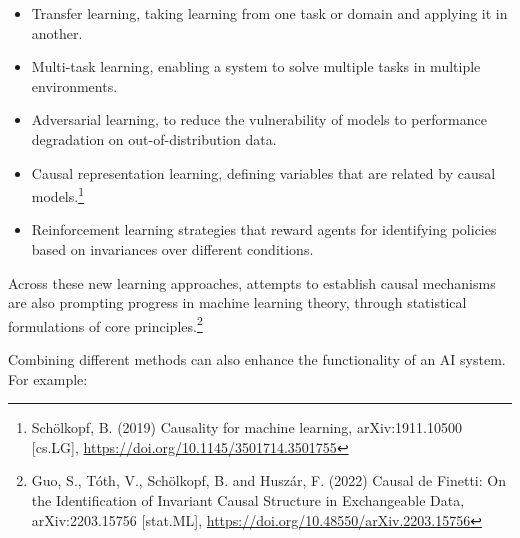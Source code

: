 \begin{itemize}
\item
  Transfer learning, taking learning from one task or domain and
  applying it in another.
\item
  Multi-task learning, enabling a system to solve multiple tasks in
  multiple environments.
\item
  Adversarial learning, to reduce the vulnerability of models to
  performance degradation on out-of-distribution data.
\item
  Causal representation learning, defining variables that are related by
  causal models.\footnote{Schölkopf, B. (2019) Causality for machine
    learning, arXiv:1911.10500 {[}cs.LG{]},
    \url{https://doi.org/10.1145/3501714.3501755}}
\item
  Reinforcement learning strategies that reward agents for identifying
  policies based on invariances over different conditions.
\end{itemize}

Across these new learning approaches, attempts to establish causal
mechanisms are also prompting progress in machine learning theory,
through statistical formulations of core principles.\footnote{Guo, S.,
  Tóth, V., Schölkopf, B. and Huszár, F. (2022) Causal de Finetti: On
  the Identification of Invariant Causal Structure in Exchangeable Data,
  arXiv:2203.15756 {[}stat.ML{]},
  \url{https://doi.org/10.48550/arXiv.2203.15756}}

Combining different methods can also enhance the functionality of an AI
system. For example:

